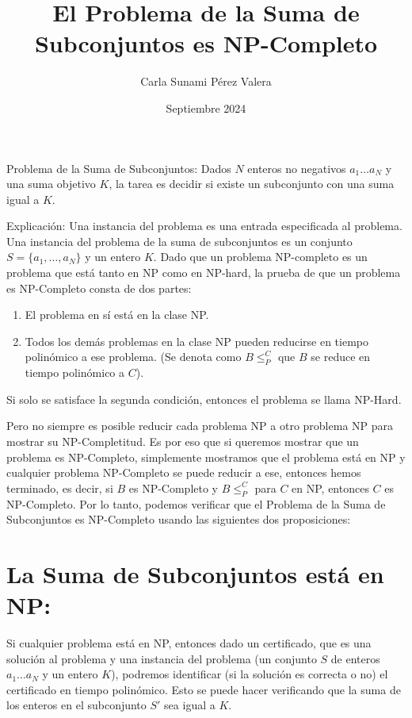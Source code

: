 \documentclass{article}
\title{El Problema de la Suma de Subconjuntos es NP-Completo}
\author{Carla Sunami Pérez Valera}
\date{Septiembre 2024}
\begin{document}
\maketitle

Problema de la Suma de Subconjuntos: Dados \( N \) enteros no negativos \( a_1 \ldots a_N \) y una suma objetivo \( K \), la tarea es decidir si existe un subconjunto con una suma igual a \( K \).

Explicación: Una instancia del problema es una entrada especificada al problema. Una instancia del problema de la suma de subconjuntos es un conjunto \( S = \{a_1, \ldots, a_N\} \) y un entero \( K \). Dado que un problema NP-completo es un problema que está tanto en NP como en NP-hard, la prueba de que un problema es NP-Completo consta de dos partes:

\begin{enumerate}
    \item El problema en sí está en la clase NP.
    \item Todos los demás problemas en la clase NP pueden reducirse en tiempo polinómico a ese problema. (Se denota como \( B \leq_P^C \) que \( B \) se reduce en tiempo polinómico a \( C \)).
\end{enumerate}

Si solo se satisface la segunda condición, entonces el problema se llama NP-Hard.

Pero no siempre es posible reducir cada problema NP a otro problema NP para mostrar su NP-Completitud. Es por eso que si queremos mostrar que un problema es NP-Completo, simplemente mostramos que el problema está en NP y cualquier problema NP-Completo se puede reducir a ese, entonces hemos terminado, es decir, si \( B \) es NP-Completo y \( B \leq_P^C \) para \( C \) en NP, entonces \( C \) es NP-Completo. Por lo tanto, podemos verificar que el Problema de la Suma de Subconjuntos es NP-Completo usando las siguientes dos proposiciones:

\section*{La Suma de Subconjuntos está en NP:}
Si cualquier problema está en NP, entonces dado un certificado, que es una solución al problema y una instancia del problema (un conjunto \( S \) de enteros \( a_1 \ldots a_N \) y un entero \( K \)), podremos identificar (si la solución es correcta o no) el certificado en tiempo polinómico. Esto se puede hacer verificando que la suma de los enteros en el subconjunto \( S' \) sea igual a \( K \).
\end{document}

